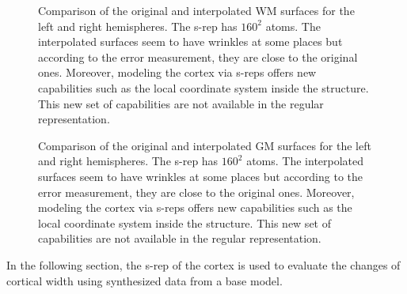 \begin{figure}
 \caption[Comparison of the interpolated and original WM surfaces.]{Comparison of the original and interpolated WM surfaces for the left and right hemispheres.
	  The s-rep has $160^2$ atoms. The interpolated surfaces seem to have wrinkles at some places 
				      but according to the error measurement, they are close to the original ones. 
	                             Moreover, modeling the cortex via s-reps offers new capabilities such as the local coordinate system inside the structure.
	                             This new set of capabilities are not available in the regular representation.}
 \label{fig:OriginalCortex}
\end{figure}
\begin{figure} 
 \caption[Comparison of the interpolated and original GM surfaces.]{Comparison of the original and interpolated GM surfaces for the left and right hemispheres.			
	The s-rep has $160^2$ atoms. The interpolated surfaces seem to have wrinkles at some places 
				      but according to the error measurement, they are close to the original ones. 
	                             Moreover, modeling the cortex via s-reps offers new capabilities such as the local coordinate system inside the structure.
	                             This new set of capabilities are not available in the regular representation.}
 \label{fig:InterpolatedCortex}  
\end{figure}

In the following section, the s-rep of the cortex is used to evaluate
the changes of cortical width using synthesized data from a base model. 


